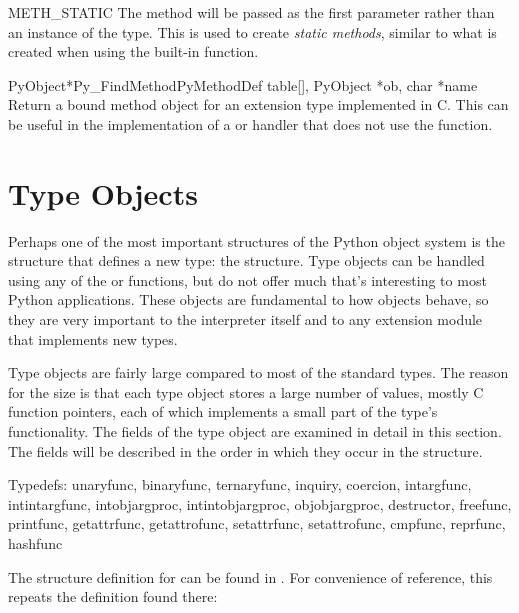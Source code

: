 \begin{datadesc}{METH_STATIC}
  The method will be passed \NULL{} as the first parameter rather than
  an instance of the type.  This is used to create \emph{static
  methods}, similar to what is created when using the
   built-in
  function.
\end{datadesc}


\begin{cfuncdesc}{PyObject*}{Py_FindMethod}{PyMethodDef table[],
                                            PyObject *ob, char *name}
  Return a bound method object for an extension type implemented in
  C.  This can be useful in the implementation of a
   or  handler that does not
  use the  function.
\end{cfuncdesc}


\section{Type Objects \label{type-structs}}

Perhaps one of the most important structures of the Python object
system is the structure that defines a new type: the
 structure.  Type objects can be handled using any
of the  or  functions,
but do not offer much that's interesting to most Python applications.
These objects are fundamental to how objects behave, so they are very
important to the interpreter itself and to any extension module that
implements new types.

Type objects are fairly large compared to most of the standard types.
The reason for the size is that each type object stores a large number
of values, mostly C function pointers, each of which implements a
small part of the type's functionality.  The fields of the type object
are examined in detail in this section.  The fields will be described
in the order in which they occur in the structure.

Typedefs:
unaryfunc, binaryfunc, ternaryfunc, inquiry, coercion, intargfunc,
intintargfunc, intobjargproc, intintobjargproc, objobjargproc,
destructor, freefunc, printfunc, getattrfunc, getattrofunc, setattrfunc,
setattrofunc, cmpfunc, reprfunc, hashfunc

The structure definition for  can be found in
.  For convenience of reference, this repeats
the definition found there:

